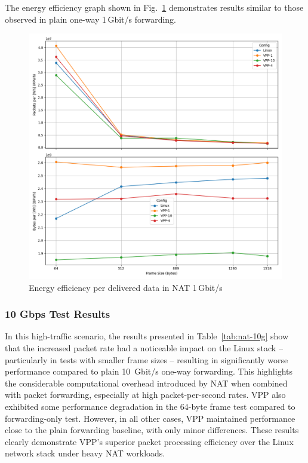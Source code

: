 The energy efficiency graph shown in Fig.~\ref{fig:nat-1g} demonstrates results similar to those observed in plain one-way 1\,Gbit/s forwarding.

\begin{figure}[!htbp]
    \centering
    \includegraphics[width=\linewidth]{images/consumption-nat-1g.png}
    \caption{Energy efficiency per delivered data in NAT 1\,Gbit/s}
    \label{fig:nat-1g}
\end{figure}

\subsubsection{10 Gbps Test Results}

In this high-traffic scenario, the results presented in Table~\ref{tab:nat-10g} show that the increased packet rate had a noticeable impact on the Linux stack -- 
particularly in tests with smaller frame sizes -- resulting in significantly worse performance compared to plain 10~Gbit/s one-way forwarding. 
This highlights the considerable computational overhead introduced by NAT when combined with packet forwarding, especially at high packet-per-second rates.
VPP also exhibited some performance degradation in the 64-byte frame test compared to forwarding-only test. 
However, in all other cases, VPP maintained performance close to the plain forwarding baseline, with only minor differences. 
These results clearly demonstrate VPP’s superior packet processing efficiency over the Linux network stack under heavy NAT workloads.

